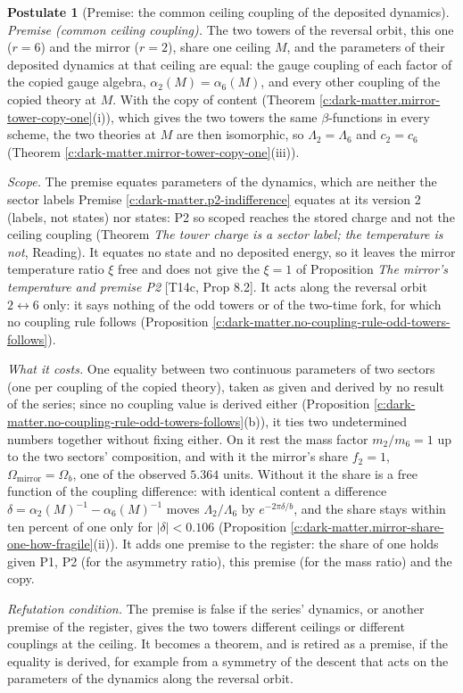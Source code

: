 \documentclass[11pt]{article}
\theoremstyle{definition}
\newtheorem{postulate}[theorem]{Postulate}
\theoremstyle{plain}
\begin{document}
\begin{postulate}[Premise: the common ceiling coupling of the deposited dynamics]\label{c:synthesis.common-ceiling-coupling-premise}
\emph{Premise (common ceiling coupling).} The two towers of the reversal orbit, this one ($r = 6$) and the mirror ($r = 2$), share one ceiling $M$, and the parameters of their deposited dynamics at that ceiling are equal: the gauge coupling of each factor of the copied gauge algebra, $\alpha_{2}(M) = \alpha_{6}(M)$, and every other coupling of the copied theory at $M$. With the copy of content (Theorem \ref{c:dark-matter.mirror-tower-copy-one}(i)), which gives the two towers the same $\beta$-functions in every scheme, the two theories at $M$ are then isomorphic, so $\Lambda_{2} = \Lambda_{6}$ and $c_{2} = c_{6}$ (Theorem \ref{c:dark-matter.mirror-tower-copy-one}(iii)).

\emph{Scope.} The premise equates parameters of the dynamics, which are neither the sector labels Premise \ref{c:dark-matter.p2-indifference} equates at its version 2 (labels, not states) nor states: P2 so scoped reaches the stored charge and not the ceiling coupling (Theorem \emph{The tower charge is a sector label; the temperature is not}, Reading). It equates no state and no deposited energy, so it leaves the mirror temperature ratio $\xi$ free and does not give the $\xi = 1$ of Proposition \emph{The mirror's temperature and premise P2} [T14c, Prop 8.2]. It acts along the reversal orbit $2 \leftrightarrow 6$ only: it says nothing of the odd towers or of the two-time fork, for which no coupling rule follows (Proposition \ref{c:dark-matter.no-coupling-rule-odd-towers-follows}).

\emph{What it costs.} One equality between two continuous parameters of two sectors (one per coupling of the copied theory), taken as given and derived by no result of the series; since no coupling value is derived either (Proposition \ref{c:dark-matter.no-coupling-rule-odd-towers-follows}(b)), it ties two undetermined numbers together without fixing either. On it rest the mass factor $m_{2}/m_{6} = 1$ up to the two sectors' composition, and with it the mirror's share $f_{2} = 1$, $\Omega_{\mathrm{mirror}} = \Omega_{b}$, one of the observed $5.364$ units. Without it the share is a free function of the coupling difference: with identical content a difference $\delta = \alpha_{2}(M)^{-1} - \alpha_{6}(M)^{-1}$ moves $\Lambda_{2}/\Lambda_{6}$ by $e^{-2\pi\delta/b}$, and the share stays within ten percent of one only for $|\delta| < 0.106$ (Proposition \ref{c:dark-matter.mirror-share-one-how-fragile}(ii)). It adds one premise to the register: the share of one holds given P1, P2 (for the asymmetry ratio), this premise (for the mass ratio) and the copy.

\emph{Refutation condition.} The premise is false if the series' dynamics, or another premise of the register, gives the two towers different ceilings or different couplings at the ceiling. It becomes a theorem, and is retired as a premise, if the equality is derived, for example from a symmetry of the descent that acts on the parameters of the dynamics along the reversal orbit.
\end{postulate}
\end{document}
